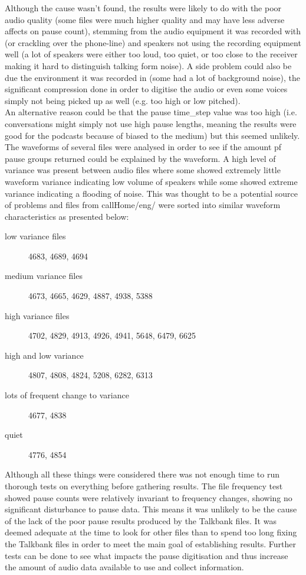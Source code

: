 Although the cause wasn't found, the results were likely to do with the poor audio quality (some files were much higher quality and may have less adverse affects on pause count), stemming from the audio equipment it was recorded with (or crackling over the phone-line) and speakers not using the recording equipment well (a lot of speakers were either too loud, too quiet, or too close to the receiver making it hard to distinguish talking form noise). A side problem could also be due the environment it was recorded in (some had a lot of background noise), the significant compression done in order to digitise the audio or even some voices simply not being picked up as well (e.g. too high or low pitched). \\

An alternative reason could be that the pause time\_step value was too high (i.e. conversations might simply not use high  pause lengths, meaning the results were good for the podcasts because of biased to the medium) but this seemed unlikely. \\

The waveforms of several files were analysed in order to see if the amount pf pause groups returned could be explained by the waveform. A high level of variance was present between audio files where some showed extremely little waveform variance indicating low volume of speakers while some showed extreme variance indicating a flooding of noise. This was thought to be a potential source of problems and files from callHome/eng/ were sorted into similar waveform characteristics as presented below: \\

\begin{description}
\item[low variance files] 4683, 4689, 4694
\item[medium variance files] 4673, 4665, 4629, 4887, 4938, 5388
\item[high variance files] 4702, 4829, 4913, 4926, 4941, 5648, 6479, 6625
\item[high and low variance] 4807, 4808, 4824, 5208, 6282, 6313
\item[lots of frequent change to variance] 4677, 4838
\item[quiet] 4776, 4854
\end{description}

Although all these things were considered there was not enough time to run thorough tests on everything before gathering results. The file frequency test showed pause counts were relatively invariant to frequency changes, showing no significant disturbance to pause data. This means it was unlikely to be the cause of the lack of the poor pause results produced by the Talkbank files. It was deemed adequate at the time to look for other files than to spend too long fixing the Talkbank files in order to meet the main goal of establishing results. Further tests can be done to see what impacts the pause digitisation and thus increase the amount of audio data available to use and collect information. \\ 

